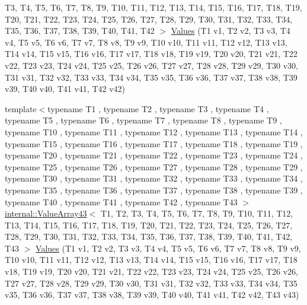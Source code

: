 \begin{DoxyCompactItemize}
\-T3, \-T4, \-T5, \-T6, \-T7, \-T8, \-T9, \*
\-T10, \-T11, \-T12, \-T13, \-T14, \-T15, \*
\-T16, \-T17, \-T18, \-T19, \-T20, \-T21, \*
\-T22, \-T23, \-T24, \-T25, \-T26, \-T27, \*
\-T28, \-T29, \-T30, \-T31, \-T32, \-T33, \*
\-T34, \-T35, \-T36, \-T37, \-T38, \-T39, \*
\-T40, \-T41, \-T42 $>$ \hyperlink{namespacetesting_a0951fc3989cde27914791eb120f8f01c}{\-Values} (\-T1 v1, \-T2 v2, \-T3 v3, \-T4 v4, \-T5 v5, \-T6 v6, \-T7 v7, \-T8 v8, \-T9 v9, \-T10 v10, \-T11 v11, \-T12 v12, \-T13 v13, \-T14 v14, \-T15 v15, \-T16 v16, \-T17 v17, \-T18 v18, \-T19 v19, \-T20 v20, \-T21 v21, \-T22 v22, \-T23 v23, \-T24 v24, \-T25 v25, \-T26 v26, \-T27 v27, \-T28 v28, \-T29 v29, \-T30 v30, \-T31 v31, \-T32 v32, \-T33 v33, \-T34 v34, \-T35 v35, \-T36 v36, \-T37 v37, \-T38 v38, \-T39 v39, \-T40 v40, \-T41 v41, \-T42 v42)
\item 
{\footnotesize template$<$typename T1 , typename T2 , typename T3 , typename T4 , typename T5 , typename T6 , typename T7 , typename T8 , typename T9 , typename T10 , typename T11 , typename T12 , typename T13 , typename T14 , typename T15 , typename T16 , typename T17 , typename T18 , typename T19 , typename T20 , typename T21 , typename T22 , typename T23 , typename T24 , typename T25 , typename T26 , typename T27 , typename T28 , typename T29 , typename T30 , typename T31 , typename T32 , typename T33 , typename T34 , typename T35 , typename T36 , typename T37 , typename T38 , typename T39 , typename T40 , typename T41 , typename T42 , typename T43 $>$ }\\\hyperlink{classtesting_1_1internal_1_1ValueArray43}{internal\-::\-Value\-Array43}$<$ \-T1, \-T2, \*
\-T3, \-T4, \-T5, \-T6, \-T7, \-T8, \-T9, \*
\-T10, \-T11, \-T12, \-T13, \-T14, \-T15, \*
\-T16, \-T17, \-T18, \-T19, \-T20, \-T21, \*
\-T22, \-T23, \-T24, \-T25, \-T26, \-T27, \*
\-T28, \-T29, \-T30, \-T31, \-T32, \-T33, \*
\-T34, \-T35, \-T36, \-T37, \-T38, \-T39, \*
\-T40, \-T41, \-T42, \-T43 $>$ \hyperlink{namespacetesting_a316b2e13e635215ac89a50315bb66d81}{\-Values} (\-T1 v1, \-T2 v2, \-T3 v3, \-T4 v4, \-T5 v5, \-T6 v6, \-T7 v7, \-T8 v8, \-T9 v9, \-T10 v10, \-T11 v11, \-T12 v12, \-T13 v13, \-T14 v14, \-T15 v15, \-T16 v16, \-T17 v17, \-T18 v18, \-T19 v19, \-T20 v20, \-T21 v21, \-T22 v22, \-T23 v23, \-T24 v24, \-T25 v25, \-T26 v26, \-T27 v27, \-T28 v28, \-T29 v29, \-T30 v30, \-T31 v31, \-T32 v32, \-T33 v33, \-T34 v34, \-T35 v35, \-T36 v36, \-T37 v37, \-T38 v38, \-T39 v39, \-T40 v40, \-T41 v41, \-T42 v42, \-T43 v43)
\item 

\end{DoxyCompactItemize}
